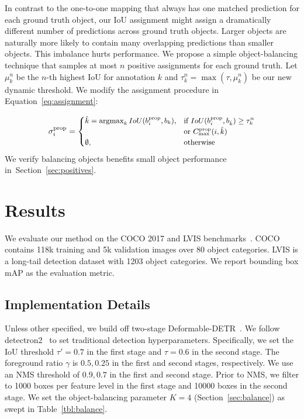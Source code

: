 \documentclass[10pt,twocolumn,letterpaper]{article}
\newcommand{\myparagraph}[1]{\vspace{2pt}\noindent{\textbf{#1}}}
\DeclareMathOperator*{\argmax}{argmax}
\newcommand{\prop}{{\text{prop}}}
\newcommand{\refsec}[1]{Section~\ref{sec:#1}}
\newcommand{\reftbl}[1]{Table~\ref{tbl:#1}}
\newcommand{\refeq}[1]{Equation~\eqref{eq:#1}}
\newcommand{\lblsec}[1]{\label{sec:#1}}
\newcommand{\lbleq}[1]{\label{eq:#1}}
\begin{document}
\myparagraph{Object Balancing.}
\lblsec{balance}
In contrast to the one-to-one mapping that always has one matched prediction for each ground truth object,
our IoU assignment might assign a dramatically different number of predictions across ground truth objects.
Larger objects are naturally more likely to contain many overlapping predictions than smaller objects.
This imbalance hurts performance.
We propose a simple object-balancing technique that samples at most $n$ positive assignments for each ground truth.
Let $\mu^n_k$ be the $n$-th highest IoU for annotation $k$ and $\tau_k^n = \max(\tau, \mu^n_k)$ be our new dynamic threshold.
We modify the assignment procedure in \refeq{assignment}:

\begin{equation}
\small
    \sigma^{\prop}_i = 
\begin{cases}
    \hat k = \argmax_k IoU(b_i^{\prop}, b_k), & \text{if } IoU(b_i^{\prop}, b_{\hat k}) \ge \tau^n_k \\
    & \text{or } C^{\prop}_{\max}(i,\hat{k}) \\
    \emptyset,                & \text{otherwise}
\end{cases}
\lbleq{assignment_n}
\normalsize
\end{equation}
We verify balancing objects benefits small object performance in~\refsec{positives}.



\section{Results}
We evaluate our method on the COCO 2017 and LVIS benchmarks~\cite{lin2015microsoft,gupta2019lvis}.
COCO contains 118k training and 5k validation images over 80 object categories.
LVIS is a long-tail detection dataset with 1203 object categories.
We report bounding box mAP as the evaluation metric.

\subsection{Implementation Details}
\lblsec{details}
Unless other specified, we build off two-stage Deformable-DETR~\cite{zhu2020deformable}.
We follow detectron2~\cite{wu2019detectron2} to set traditional detection hyperparameters.
Specifically, we set the IoU threshold $\tau'=0.7$ in the first stage and $\tau=0.6$ in the second stage.
The foreground ratio $\gamma$ is $0.5,0.25$ in the first and second stages, respectively.
We use an NMS threshold of $0.9,0.7$ in the first and second stage.
Prior to NMS, we filter to 1000 boxes per feature level in the first stage and 10000 boxes in the second stage.
We set the object-balancing parameter $K=4$ (\refsec{balance}) as swept in \reftbl{balance}.
\end{document}
